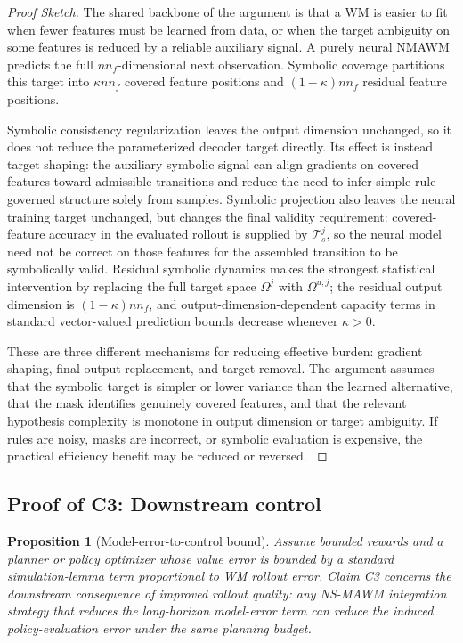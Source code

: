 \documentclass{article}
\theoremstyle{plain}
\newtheorem{proposition}[theorem]{Proposition}
\theoremstyle{definition}
\theoremstyle{remark}
\begin{document}
\begin{proof}[Proof Sketch]
  The shared backbone of the argument is that a WM is easier to fit when fewer features must be learned from data, or when the target ambiguity on some features is reduced by a reliable auxiliary signal. A purely neural NMAWM predicts the full $n n_f$-dimensional next observation. Symbolic coverage partitions this target into $\kappa n n_f$ covered feature positions and $(1-\kappa)n n_f$ residual feature positions.

  Symbolic consistency regularization leaves the output dimension unchanged, so it does not reduce the parameterized decoder target directly. Its effect is instead target shaping: the auxiliary symbolic signal can align gradients on covered features toward admissible transitions and reduce the need to infer simple rule-governed structure solely from samples. Symbolic projection also leaves the neural training target unchanged, but changes the final validity requirement: covered-feature accuracy in the evaluated rollout is supplied by $\mathcal{T}^j_s$, so the neural model need not be correct on those features for the assembled transition to be symbolically valid. Residual symbolic dynamics makes the strongest statistical intervention by replacing the full target space $\Omega^j$ with $\Omega^{u,j}$; the residual output dimension is $(1-\kappa)n n_f$, and output-dimension-dependent capacity terms in standard vector-valued prediction bounds decrease whenever $\kappa>0$.

  These are three different mechanisms for reducing effective burden: gradient shaping, final-output replacement, and target removal. The argument assumes that the symbolic target is simpler or lower variance than the learned alternative, that the mask identifies genuinely covered features, and that the relevant hypothesis complexity is monotone in output dimension or target ambiguity. If rules are noisy, masks are incorrect, or symbolic evaluation is expensive, the practical efficiency benefit may be reduced or reversed.
  \label{app:proofs:c2}
\end{proof}

\subsection{Proof of C3: Downstream control}
\label{app:proof-c3}

\begin{proposition}[Model-error-to-control bound]
  Assume bounded rewards and a planner or policy optimizer whose value error is bounded by a standard simulation-lemma term proportional to WM rollout error. Claim C3 concerns the downstream consequence of improved rollout quality: any NS-MAWM integration strategy that reduces the long-horizon model-error term can reduce the induced policy-evaluation error under the same planning budget.
\end{proposition}
\end{document}
